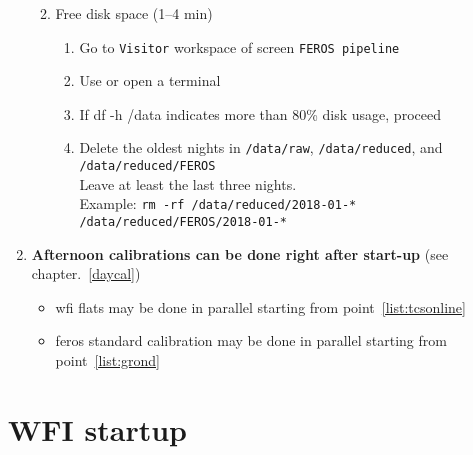 \documentclass[11pt,fleqn]{book}
\begin{document}
\begin{enumerate}
\begin{enumerate}
\begin{enumerate}
		\end{enumerate}
		\item Free disk space (1--4 min)
		\begin{enumerate}
		    \item Go to \texttt{Visitor} workspace of screen \texttt{FEROS pipeline}
		    \item Use or open a terminal
		    \item If df -h /data indicates more than 80\% disk usage, proceed
		    \item Delete the oldest nights in \texttt{/data/raw}, \texttt{/data/reduced}, and
		    \texttt{/data/reduced/FEROS}\\
		          Leave at least the last three nights.\\
		          Example: \texttt{rm -rf /data/reduced/2018-01-* /data/reduced/FEROS/2018-01-*}
		\end{enumerate}
	\end{enumerate} 
    \item\textbf{Afternoon calibrations can be done right after start-up} (see chapter.~\ref{daycal})
        \begin{itemize}
        \item \gls{wfi} flats may be done in parallel starting from point~\ref{list:tcsonline}
        \item \gls{feros} standard calibration may be done in parallel starting from point~\ref{list:grond}
        \end{itemize}
\end{enumerate}
\newpage

\section{WFI startup}
\end{document}
